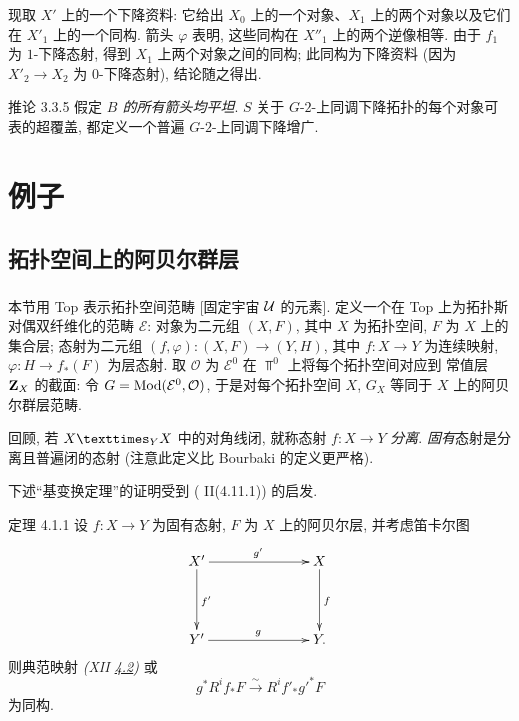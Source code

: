现取 $X'$ 上的一个下降资料:
它给出 $X_0$ 上的一个对象、$X_1$ 上的两个对象以及它们在 $X'_1$ 上的一个同构.
箭头 $\varphi$ 表明, 这些同构在 $X''_1$ 上的两个逆像相等.
由于 $f_1$ 为 $1$-下降态射, 得到 $X_1$ 上两个对象之间的同构;
此同构为下降资料 (因为 $X'_2\to X_2$ 为 $0$-下降态射), 结论随之得出.

\begin{enonce*}{推论 3.3.5}
假定 \emph{$B$ 的所有箭头均平坦}.
$S$ 关于 $G$-$2$-上同调下降拓扑的每个对象可表的超覆盖,
都定义一个普遍 $G$-$2$-上同调下降增广.
\end{enonce*}



\section{例子}

\subsection{拓扑空间上的阿贝尔群层}

\setcounter{subsubsection}{-1}
\subsubsection{}
本节用 Top 表示拓扑空间范畴 [固定宇宙 ${\mathcal U}$ 的元素].
定义一个在 Top 上为拓扑斯对偶双纤维化的范畴 $\mathcal{E}$:
对象为二元组 $(X, F)$, 其中 $X$ 为拓扑空间, $F$ 为 $X$ 上的集合层;
态射为二元组 $(f, \varphi) : (X, F) \to (Y, H)$,
其中 $f : X \to Y$ 为连续映射, $\varphi : H \to f_{\ast} (F)$ 为层态射.
取 $\mathcal{O}$ 为 $\mathcal{E}^0$ 在 $\Top^0$ 上将每个拓扑空间对应到
常值层 $\mathbf{Z}_X$ 的截面: 令 $G = \Ysheaf{\Mod}(\mathcal{E}^0, \mathcal{O})$,
于是对每个拓扑空间 $X$, $G_X$ 等同于 $X$ 上的阿贝尔群层范畴.

回顾, 若 $\fprod{X}{X}{Y}$ 中的对角线闭,
就称态射 $f : X \to Y$ \emph{分离}.
\emph{固有}态射是分离且普遍闭的态射 (注意此定义比 Bourbaki 的定义更严格).

下述“基变换定理”的\pageoriginale{}证明受到 (\cite{sga4.exp.Vbis.bib.5} II(4.11.1)) 的启发.

\begin{enonce*}{定理 4.1.1}
设 $f : X \to Y$ 为固有态射, $F$ 为 $X$ 上的阿贝尔层, 并考虑笛卡尔图
\[
\xymatrix@C=2.5cm@R=1.5cm{
X' \ar[r]^{g'} \ar[d]^{f'}& X\ar[d]^{f}\\
Y' \ar[r]^{g}& Y.
}
\]
则典范映射 \emph{(XII \hyperref[XII.eq4.2]{4.2})}
或 \emph{}
$$
g^{\ast} R^i f_{\ast} F \xrightarrow{\sim} R^i f'_{\ast} {g'}^{\ast}F
$$
为同构.
\end{enonce*}

